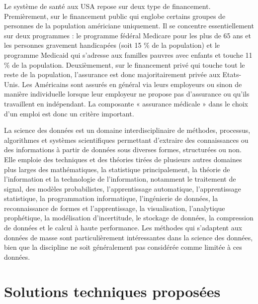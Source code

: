 \documentclass[9pt, french]{article}
\begin{document}
	Le système de santé aux USA repose sur deux type de financement. Premièrement, sur le financement public qui englobe certains groupes de personnes de la population américiane uniquement. Il se concentre essentiellement sur deux programmes : le programme 		fédéral Medicare pour les plus de 65 ans et les personnes gravement handicapées (soit 15 \% de la population) et le programme Medicaid qui s’adresse aux familles pauvres avec enfants et touche 11 \% de la population. Deuxièmement, sur le financement privé qui touche tout le reste de la population, l’assurance est donc majoritairement privée aux Etats-Unis. Les Américains sont assurés en général via leurs employeurs ou sinon de manière individuelle lorsque leur employeur ne propose pas d’assurance ou qu’ils travaillent en indépendant. La composante « assurance médicale » dans le choix d’un emploi est donc un critère important.
	
	La science des données est un domaine interdisciplinaire de méthodes, processus, algorithmes et systèmes scientifiques permettant d'extraire des connaissances ou des informations à partir de données sous diverses formes, structurées ou non. Elle emploie des techniques et des théories tirées de plusieurs autres domaines plus larges des mathématiques, la statistique principalement, la théorie de l'information et la technologie de l'information, notamment le traitement de signal, des modèles probabilistes, l'apprentissage automatique, l'apprentissage statistique, la programmation informatique, l'ingénierie de données, la reconnaissance de formes et l'apprentissage, la visualisation, l'analytique prophétique, la modélisation d'incertitude, le stockage de données, la compression de données et le calcul à haute performance. Les méthodes qui s'adaptent aux données de masse sont particulièrement intéressantes dans la science des données, bien que la discipline ne soit généralement pas considérée comme limitée à ces données.\\
	
		

	\section{Solutions techniques proposées}
	
	

	
	
\end{document}
